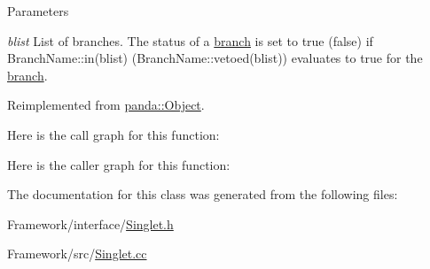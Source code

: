 \begin{DoxyParams}{Parameters}
\item[{\em blist}]List of branches. The status of a \hyperlink{namespacepanda_1_1branch}{branch} is set to true (false) if BranchName::in(blist) (BranchName::vetoed(blist)) evaluates to true for the \hyperlink{namespacepanda_1_1branch}{branch}. \end{DoxyParams}


Reimplemented from \hyperlink{classpanda_1_1Object_a282e820b1ad431db22ca4d4dd20b55e0}{panda::Object}.

Here is the call graph for this function:

Here is the caller graph for this function:

The documentation for this class was generated from the following files:\begin{DoxyCompactItemize}
\item 
Framework/interface/\hyperlink{Singlet_8h}{Singlet.h}\item 
Framework/src/\hyperlink{Singlet_8cc}{Singlet.cc}\end{DoxyCompactItemize}
